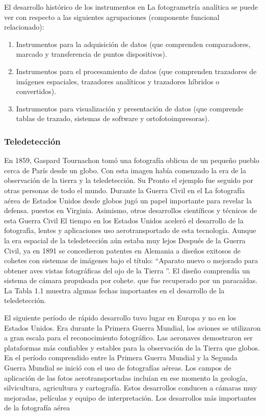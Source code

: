 El desarrollo histórico de los instrumentos en
La fotogrametría analítica se puede ver con respecto
a las siguientes agrupaciones (componente funcional
relacionado):

\begin{enumerate}
    \item Instrumentos para la adquisición de datos (que comprenden
    comparadores, marcado y transferencia de puntos
    dispositivos).
    \item Instrumentos para el procesamiento de datos (que comprenden
    trazadores de imágenes espaciales, trazadores analíticos y
    trazadores híbridos o convertidos).
    \item Instrumentos para visualización y presentación de datos
    (que comprende tablas de trazado, sistemas de software
    y ortofotoimpresoras).
\end{enumerate}


\subsubsection{Teledetección}

En 1859, Gaspard Tournachon tomó una fotografía oblicua de un pequeño pueblo cerca de París desde un
globo. Con esta imagen había comenzado la era de la observación de la tierra y la teledetección. Su
Pronto el ejemplo fue seguido por otras personas de todo el mundo. Durante la Guerra Civil en el
La fotografía aérea de Estados Unidos desde globos jugó un papel importante para revelar la defensa.
puestos en Virginia. Asimismo, otros desarrollos científicos y técnicos de esta Guerra Civil
El tiempo en los Estados Unidos aceleró el desarrollo de la fotografía, lentes y aplicaciones
uso aerotransportado de esta tecnología. Aunque la era espacial de la teledetección aún estaba muy lejos
Después de la Guerra Civil, ya en 1891 se concedieron patentes en Alemania a diseños exitosos de
cohetes con sistemas de imágenes bajo el título: ``Aparato nuevo o mejorado para obtener aves
vistas fotográficas del ojo de la Tierra ”. El diseño comprendía un sistema de cámara propulsada por cohete.
que fue recuperado por un paracaídas. La Tabla 1.1 muestra algunas fechas importantes en el desarrollo
de la teledetección.

El siguiente período de rápido desarrollo tuvo lugar en Europa y no en los Estados Unidos. Era durante la Primera Guerra Mundial, los aviones se utilizaron a gran escala para el reconocimiento fotográfico.
Las aeronaves demostraron ser plataformas más confiables y estables para la observación de la Tierra que
globos. En el período comprendido entre la Primera Guerra Mundial y la Segunda Guerra Mundial se inició con el
uso de fotografías aéreas. Los campos de aplicación de las fotos aerotransportadas incluían en ese momento la geología,
silvicultura, agricultura y cartografía. Estos desarrollos conducen a cámaras muy mejoradas,
películas y equipo de interpretación. Los desarrollos más importantes de la fotografía aérea

